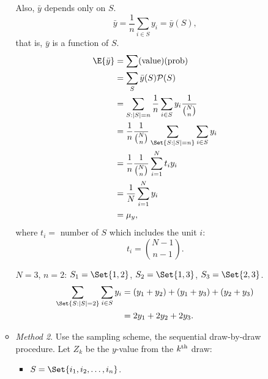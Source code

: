 \begin{Result}{}
\begin{enumerate}[(a)]
\begin{itemize}
                        Also, $ \bar{y} $ depends only on $ S $.
                        \[ \bar{y}=\frac{1}{n}\sum_{i\in S}y_i=\bar{y}(S), \]
                        that is, $ \bar{y} $ is a function of $ S $.
                        \begin{align*}
                            \E{\bar{y}}
                             & =\sum(\text{value})(\text{prob})                                                  \\
                             & =\sum_S \bar{y}(S)\mathcal{P}(S)                                                  \\
                             & =\sum_{S:\abs{S}=n}\frac{1}{n}\sum_{i\in S}y_i \frac{1}{\binom{N}{n}}             \\
                             & =\frac{1}{n}\frac{1}{\binom{N}{n}}\sum_{\Set{S\given \abs{S}=n}} \sum_{i\in S}y_i \\
                             & =\frac{1}{n}\frac{1}{\binom{N}{n}}\sum_{i=1}^{N}t_i y_i                           \\
                             & =\frac{1}{N}\sum_{i=1}^{N}y_i                                                     \\
                             & =\mu_y,
                        \end{align*}
                        where $ t_i = $ number of $S$ which includes the unit $ i $:
                        \[ t_i=\binom{N-1}{n-1}. \]
                        \begin{Example}{}
                            $ N=3 $, $ n=2 $: $ S_1=\Set{1,2} $, $ S_2=\Set{1,3} $, $ S_3=\Set{2,3} $.
                            \begin{align*}
                                \sum_{\Set{S\given\abs{S}=2}} \sum_{i\in S}y_i
                                 & =(y_1+y_2)+(y_1+y_3)+(y_2+y_3) \\
                                 & =2 y_1+2y_2+2y_3.
                            \end{align*}
                        \end{Example}
                  \item \emph{Method 2}. Use the sampling scheme, the sequential
                        draw-by-draw procedure. Let $ Z_k $ be the $ y $-value from the
                        $ k\textsuperscript{th} $ draw:
                        \begin{itemize}
                            \item $ S=\Set{i_1,i_2,\ldots,i_n} $.

\end{itemize}
\end{itemize}
\end{enumerate}
\end{Result}
